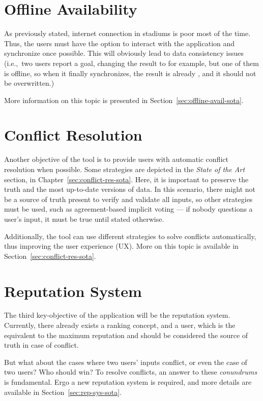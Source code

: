 \section{Offline Availability} \label{sec:offline-avail-intro}

As previously stated, internet connection in stadiums is poor most of the time. Thus, the users must have the option to interact with the application and synchronize once possible. This will obviously lead to data consistency issues (i.e.,\ two users report a goal, changing the result to  for example, but one of them is offline, so when it finally synchronizes, the result is already , and it should not be overwritten.)

More information on this topic is presented in Section~\ref{sec:offline-avail-sota}.

\section{Conflict Resolution} \label{sec:conflict-res-intro}

Another objective of the tool is to provide users with automatic conflict resolution when possible. Some strategies are depicted in the \textit{State of the Art} section, in Chapter~\ref{sec:conflict-res-sota}. Here, it is important to preserve the truth and the most up-to-date versions of data. In this scenario, there might not be a source of truth present to verify and validate all inputs, so other strategies must be used, such as agreement-based implicit voting --- if nobody questions a user's input, it must be true until stated otherwise.

Additionally, the tool can use different strategies to solve conflicts automatically, thus improving the user experience (UX). More on this topic is available in Section~\ref{sec:conflict-res-sota}.

\section{Reputation System} \label{sec:rep-sys-intro}

The third key-objective of the application will be the reputation system. Currently, there already exists a ranking concept, and a  user, which is the equivalent to the maximum reputation and should be considered the source of truth in case of conflict.

But what about the cases where two  users' inputs conflict, or even the case of two  users? Who should win? To resolve conflicts, an answer to these \textit{conundrums} is fundamental. Ergo a new reputation system is required, and more details are available in Section~\ref{sec:rep-sys-sota}.

